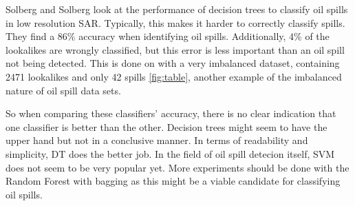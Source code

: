 
Solberg and Solberg \cite{Delfrate2004} look at the performance of decision trees to classify oil spills in low resolution SAR. Typically, this makes it harder to correctly classify spills. They find a $86$\% accuracy when identifying oil spills. Additionally, $4$\% of the lookalikes are wrongly classified, but this error is less important than an oil spill not being detected. This is done on with a very imbalanced dataset, containing 2471 lookalikes and only 42 spills \ref{fig:table}, another example of the imbalanced nature of oil spill data sets.

So when comparing these classifiers' accuracy, there is no clear indication that one classifier is better than the other. Decision trees might seem to have the upper hand but not in a conclusive manner. In terms of readability and simplicity, DT does the better job. In the field of oil spill detecion itself, SVM does not seem to be very popular yet. More experiments should be done with the Random Forest with bagging as this might be a viable candidate for classifying oil spills.